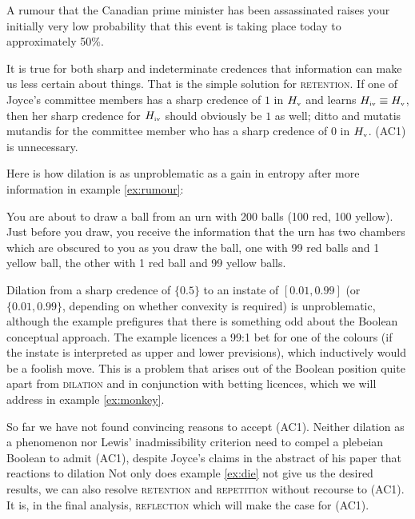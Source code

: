 \documentclass[12pt]{article}
\begin{document}
\begin{quotex}
  \label{ex:rumour} A rumour that the Canadian prime
  minister has been assassinated raises your initially very low
  probability that this event is taking place today to approximately
  50\%.
\end{quotex}

It is true for both sharp and indeterminate credences that information
can make us less certain about things. That is the simple solution for
\textsc{retention}. If one of Joyce's committee members has a sharp
credence of $1$ in $H_{\mbox{\tiny{v}}}$ and learns
$H_{\mbox{\tiny{iv}}}\equiv{}H_{\mbox{\tiny{v}}}$, then her sharp
credence for $H_{\mbox{\tiny{iv}}}$ should obviously be $1$ as well;
ditto and mutatis mutandis for the committee member who has a sharp
credence of $0$ in $H_{\mbox{\tiny{v}}}$. (AC1) is unnecessary.

Here is how dilation is as unproblematic as a gain in entropy after
more information in example \ref{ex:rumour}:

\begin{quotex}
  \label{ex:urns} You are about to draw a ball
  from an urn with 200 balls (100 red, 100 yellow). Just before you
  draw, you receive the information that the urn has two chambers
  which are obscured to you as you draw the ball, one with 99 red
  balls and 1 yellow ball, the other with 1 red ball and 99 yellow
  balls.
\end{quotex}

Dilation from a sharp credence of $\{0.5\}$ to an instate of
$[0.01,0.99]$ (or $\{0.01,0.99\}$, depending on whether convexity is
required) is unproblematic, although the example prefigures that there
is something odd about the Boolean conceptual approach. The example
licences a 99:1 bet for one of the colours (if the instate is
interpreted as upper and lower previsions), which inductively would be
a foolish move. This is a problem that arises out of the Boolean
position quite apart from \textsc{dilation} and in conjunction with
betting licences, which we will address in example \ref{ex:monkey}.

So far we have not found convincing reasons to accept (AC1). Neither
dilation as a phenomenon nor Lewis' inadmissibility criterion need to
compel a plebeian Boolean to admit (AC1), despite Joyce's claims in
the abstract of his paper that reactions to dilation  Not only does example \ref{ex:die} not
give us the desired results, we can also resolve \textsc{retention}
and \textsc{repetition} without recourse to (AC1). It is, in the final
analysis, \textsc{reflection} which will make the case for (AC1).
\end{document}
